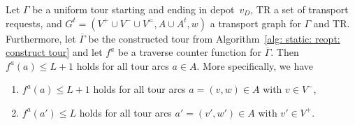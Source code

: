 \documentclass[english]{llncs}
\numberwithin{sublemma}{lemma}
\newcommand{\capd}{\ensuremath{L}}
\newcommand{\tourd}{\ensuremath{\Gamma}}
\newcommand{\TR}{\mathrm{TR}}
\newcommand{\Vpick}{{V^+}}
\newcommand{\Vdrop}{{V^-}}
\newcommand{\Vbal}{{V^=}}
\begin{document}
\begin{lemma}
\label{lem: static: reopt: f leq c plus 1}
  Let ${\tourd}$ be a uniform tour starting and ending in depot~$v_D$, $\TR$ a set of transport requests, and $G^t = (\Vpick \cup \Vdrop \cup \Vbal, A \cup A^t, w)$ a transport graph for $\tourd$ and $\TR$.
  Furthermore, let $\overline{\tourd}$ be the constructed tour from Algorithm~\ref{alg: static: reopt: construct tour} and let $f^a$ be a traverse counter function for $\overline{\tourd}$.
  Then $f^a(a) \leq \capd + 1$ holds for all tour arcs $a \in A$.
  More specifically, we have
  \begin{enumerate}
   \item \label{lem: static: reopt: f leq c plus 1: 1} $f^a(a) \leq \capd + 1$ holds for all tour arcs $a = (v,w) \in A$ with $v \in \Vdrop$,
   \item \label{lem: static: reopt: f leq c plus 1: 2} $f^a(a') \leq \capd$ holds for all tour arcs $a' = (v', w') \in A$ with $v' \in \Vpick$.
  \end{enumerate}
\end{lemma}
\end{document}
